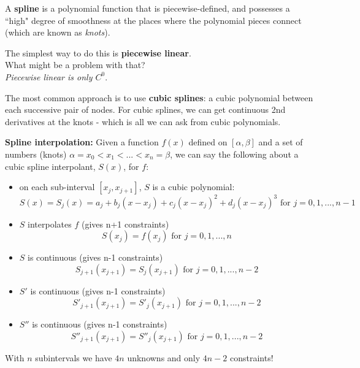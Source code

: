 \documentclass[12pt]{article}
\begin{document}
%
%
%
%
%
A \textbf{spline} is a polynomial function that is piecewise-defined, and possesses a ``high" degree of smoothness at the places where the polynomial pieces connect (which are known as \textit{knots}).

The simplest way to do this is \textbf{piecewise linear}.\\ What might be a problem with that?\\ \textit{Piecewise linear is only $C^0$}.

The most common approach is to use \textbf{cubic splines}: a cubic polynomial between each successive pair of nodes. For cubic splines, we can get continuous 2nd derivatives at the knots - which is all we can ask from cubic polynomials. 

\textbf{Spline interpolation:} Given a function $f(x)$ defined on $[\alpha, \beta]$ and a set of numbers (knots) $\alpha=x_0 < x_1 < ... < x_n = \beta$, we can say the following about a cubic spline interpolant, $S(x)$, for $f$:
%
\begin{itemize}
\item on each sub-interval $[x_j, x_{j+1}]$, $S$ is a cubic polynomial:
\[S(x) = S_j(x) = a_j + b_j(x-x_j) + c_j(x-x_j)^2 + d_j(x-x_j)^3 \text{ for } j = 0, 1, ..., n-1\]

\item $S$ interpolates $f$ (gives n+1 constraints)
\[S(x_j) = f(x_j)\text{ for } j = 0, 1, ..., n\]

\item $S$ is continuous (gives n-1 constraints)
\[S_{j+1}(x_{j+1}) = S_{j}(x_{j+1})\text{ for } j = 0, 1, ..., n-2\]

\item $S'$ is continuous (gives n-1 constraints)
\[S'_{j+1}(x_{j+1}) = S'_{j}(x_{j+1})\text{ for } j = 0, 1, ..., n-2\]

\item $S''$ is continuous (gives n-1 constraints)
\[S''_{j+1}(x_{j+1}) = S''_{j}(x_{j+1})\text{ for } j = 0, 1, ..., n-2\]
\end{itemize}
%
With $n$ subintervals we have $4n$ unknowns and only $4n-2$ constraints!
\end{document}

